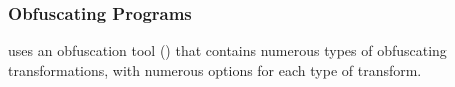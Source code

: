 
\subsubsection{Obfuscating Programs}
\revenge uses an obfuscation tool (\tigress) that contains numerous types of obfuscating transformations, with numerous options for each type of transform. %

